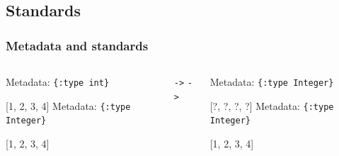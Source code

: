 \documentclass{beamer}
\newcommand{\linespace}{\vskip 0.25cm}
\begin{document}
\subsection{Standards}

\begin{frame}
  \frametitle{Metadata and standards}
  \begin{columns}
  \begin{column}{0.5\textwidth}
  Metadata: {\tt \{:type int\}}
  
  [1, 2, 3, 4]
  \linespace
  \linespace
  Metadata: {\tt \{:type Integer\}}
  
  [1, 2, 3, 4]
  \end{column}
  \begin{column}{0.05\textwidth} 
  {\tt->}
  \linespace
  \linespace
  {\tt->}
  \end{column}
  \begin{column}{0.5\textwidth}
  Metadata: {\tt \{:type Integer\}}
  
  [?, ?, ?, ?]
  \linespace
  \linespace
  Metadata: {\tt \{:type Integer\}}
  
  [1, 2, 3, 4]
  \end{column}
  \end{columns}
  
\end{frame}
\end{document}
